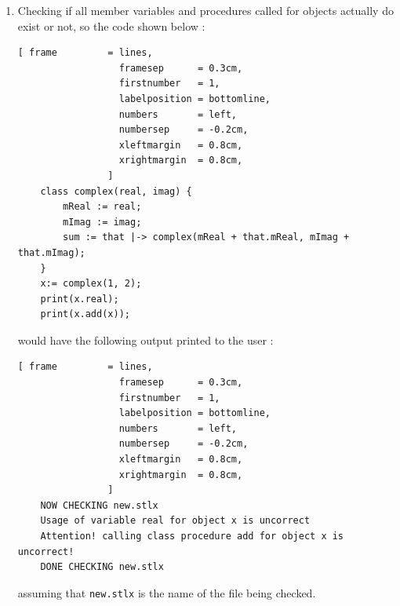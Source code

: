 \documentclass[11pt]{report}
\begin{document}
\begin{enumerate}
\item Checking if all member variables and procedures called for objects actually do exist or not, so the code shown below : 
\begin{Verbatim}[ frame         = lines, 
                  framesep      = 0.3cm, 
                  firstnumber   = 1,
                  labelposition = bottomline,
                  numbers       = left,
                  numbersep     = -0.2cm,
                  xleftmargin   = 0.8cm,
                  xrightmargin  = 0.8cm,
                ]
    class complex(real, imag) {
        mReal := real;
        mImag := imag;
        sum := that |-> complex(mReal + that.mReal, mImag + that.mImag);
    }
    x:= complex(1, 2);
    print(x.real);
    print(x.add(x));
\end{Verbatim}
would have the following output printed to the user :
\begin{Verbatim}[ frame         = lines, 
                  framesep      = 0.3cm, 
                  firstnumber   = 1,
                  labelposition = bottomline,
                  numbers       = left,
                  numbersep     = -0.2cm,
                  xleftmargin   = 0.8cm,
                  xrightmargin  = 0.8cm,
                ]
    NOW CHECKING new.stlx
    Usage of variable real for object x is uncorrect
    Attention! calling class procedure add for object x is uncorrect!
    DONE CHECKING new.stlx
\end{Verbatim}
assuming that \texttt{new.stlx} is the name of the file being checked.



\end{enumerate}
\end{document}
